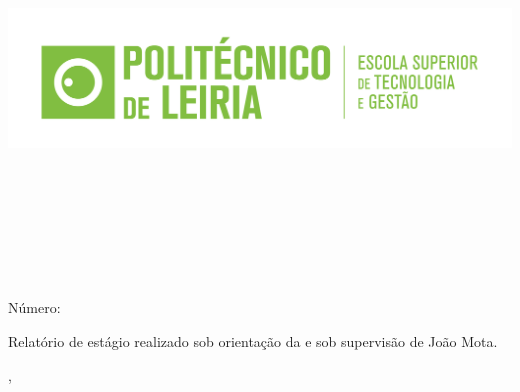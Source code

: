 
\begin{titlepage}

\begin{center}

\hfill

\includegraphics[width=\textwidth]{Covers/estg_h.png} \\

\bigskip
\large
\myFaculty \\
\mySchool \\ 
\myDepartment \\
\myDegree \\



\begingroup
\color{Maroon}

\vspace{4cm}

\spacedallcaps{\myTitle} \\ \bigskip %
\endgroup

\vspace{4cm}



\spacedlowsmallcaps{\myNameOne}\\
Número: \myNumber \\
\bigskip %

\vfill

\end{center}

\begin{normalsize}
    
    \noindent Relatório de estágio realizado sob orientação da \myProfOne e sob supervisão de João Mota.

\end{normalsize}
\vspace{1cm}

\begin{center}

\myLocation, \myTime\ %
    
\end{center}




\end{titlepage}

\cleardoublepage

